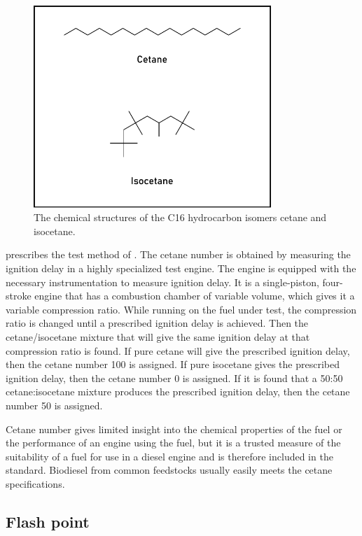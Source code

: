 \begin{figure}
\centering
\includegraphics[width=0.8\textwidth]{Figures/cetane.pdf}
\decoRule

\caption[Cetane and isocetane]{The chemical structures of the C16 hydrocarbon
isomers cetane and isocetane.}
\label{fig:Cetane}
\end{figure}

 prescribes the test method of . The cetane number
is obtained by measuring the ignition delay in a highly specialized test engine.
The engine is equipped with the necessary instrumentation to measure ignition
delay. It is a single-piston, four-stroke engine that has a combustion chamber
of variable volume, which gives it a variable compression ratio. While running
on the fuel under test, the compression ratio is changed until a prescribed
ignition delay is achieved. Then the cetane/isocetane mixture that will give the
same ignition delay at that compression ratio is found. If pure cetane will give
the prescribed ignition delay, then the cetane number 100 is assigned. If pure
isocetane gives the prescribed ignition delay, then the cetane number 0 is
assigned. If it is found that a 50:50 cetane:isocetane mixture produces the
prescribed ignition delay, then the cetane number 50 is assigned.

Cetane number gives limited insight into the chemical properties of the fuel or
the performance of an engine using the fuel, but it is a trusted measure of the
suitability of a fuel for use in a diesel engine and is therefore included in
the standard. Biodiesel from common feedstocks usually easily meets the cetane
specifications.

\subsection{Flash point}

